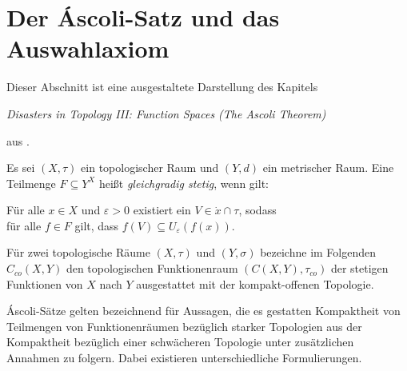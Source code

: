 \chapter{Der Áscoli-Satz und das Auswahlaxiom}

Dieser Abschnitt ist eine ausgestaltete Darstellung des Kapitels  
\begin{addmargin}[2em]{2em}%
  \textit{Disasters in Topology III: Function Spaces (The Ascoli Theorem)}
\end{addmargin}
aus \cite{herrlich2006axiom}.


\begin{defn}
  Es sei $(X,\tau)$ ein topologischer Raum und $(Y,d)$ ein metrischer Raum. Eine Teilmenge $F \subseteq Y^X$ heißt \textit{gleichgradig stetig}, wenn gilt:
  \begin{addmargin}[2em]{2em}%
    Für alle $x \in X$ und $\varepsilon > 0$ existiert ein $V \in \dot{x} \cap \tau$, sodass \\
    für alle $f \in F$ gilt, dass $f(V) \subseteq U_\varepsilon(f(x))$.
  \end{addmargin}
\end{defn}

Für zwei topologische Räume $(X,\tau)$ und $(Y,\sigma)$ bezeichne im Folgenden $C_{co}(X,Y)$ den topologischen Funktionenraum $(C(X,Y),\tau_{co})$ der stetigen Funktionen von $X$ nach $Y$ ausgestattet mit der kompakt-offenen Topologie.

Áscoli-Sätze gelten bezeichnend für Aussagen, die es gestatten Kompaktheit von Teilmengen von Funktionenräumen bezüglich starker Topologien aus der Kompaktheit bezüglich einer schwächeren Topologie unter zusätzlichen Annahmen zu folgern. Dabei existieren unterschiedliche Formulierungen.

